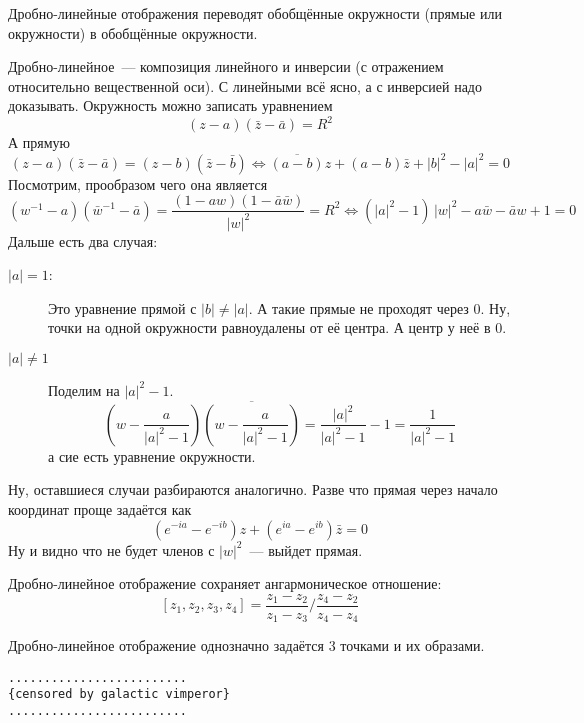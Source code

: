 \documentclass[12pt,timbord]{../../../notes}
\begin{document}
\begin{prop}\label{prop:tfcv::fraclin::cicle}
  Дробно-линейные отображения переводят обобщённые окружности (прямые или окружности) в обобщённые
  окружности.
\end{prop}
\begin{itlproof}
  Дробно-линейное~--- композиция линейного и инверсии (с отражением относительно вещественной оси).
  С линейными всё ясно, а с инверсией надо доказывать. Окружность можно записать уравнением
  \[
    (z-a)(\bar z- \bar a) = R^2
  \]
  А прямую 
  \[
    (z-a)(\bar z - \bar a) = (z-b)(\bar z - \bar b) 
    \Leftrightarrow \overline{(a -  b)} z + (a-b) \bar z + |b|^2 - |a|^2 = 0 
  \]
  Посмотрим, прообразом чего она является
  \[
    \left(w^{-1} - a\right)\left(\bar{w}^{-1} - \bar a\right) 
    = \frac{(1 - aw)(1 - \bar a \bar w)}{|w|^2} = R^2 \Leftrightarrow 
    (|a|^2-1)\, |w|^2 - a \bar w - \bar a w + 1= 0 
  \]
  Дальше есть два случая:
  \begin{description}
    \item[$|a|=1$:] Это уравнение прямой с $|b|\neq |a|$. А такие прямые не проходят через $0$.
      Ну, точки на одной окружности равноудалены от её центра. А центр у неё в 0.
    \item[$|a|\neq 1$] Поделим на $|a|^2 - 1$.
      \[
        \left(w - \frac{a}{|a|^2 -1}\right)
        \overline{\left(w - \frac{a}{|a|^2 -1}\right)} = \frac{|a|^2}{|a|^2-1}-1=\frac{1}{|a|^2-1}
      \]
      а сие есть уравнение окружности.
  \end{description}
  Ну, оставшиеся случаи разбираются аналогично. Разве что прямая через начало координат 
  проще задаётся как 
  \[
    (e^{-ia} - e^{-ib} ) z + (e^{ia} - e^{ib}) \bar z = 0
  \]
  Ну и видно что не будет членов с $|w|^2$~--- выйдет прямая.
\end{itlproof}

\begin{prop}\label{prop:tfcv::fraclin::angarm}
  Дробно-линейное отображение сохраняет ангармоническое отношение:
  \[
    [z_1, z_2, z_3, z_4 ] = \frac{z_1 - z_2}{z_1 - z_3} / \frac{z_4 - z_2}{z_4 - z_4}
  \]
\end{prop}

\begin{prop}\label{prop:tfcv::fraclin::fixpoints}
  Дробно-линейное отображение однозначно задаётся 3 точками и их образами.
\end{prop}

\begin{verbatim}
.........................
{censored by galactic vimperor}
.........................
\end{verbatim}
\setcounter{paragraph}{41}
\end{document}
